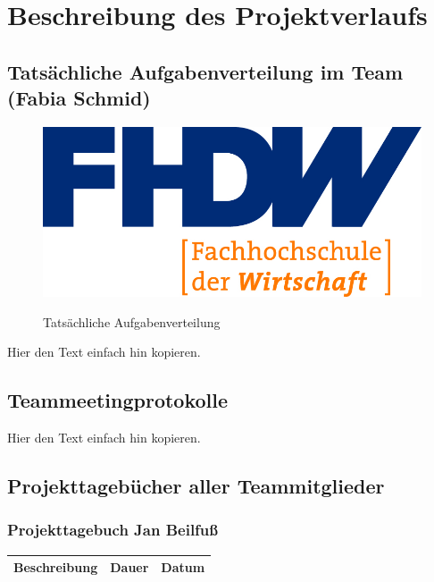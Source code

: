 \section{Beschreibung des Projektverlaufs}
\label{instal}

\subsection{Tatsächliche Aufgabenverteilung im Team (Fabia Schmid)}

\begin{figure}[H]
\centering
\begin{minipage}[t]{1\textwidth} %
\caption{Tatsächliche Aufgabenverteilung} %
\includegraphics[width=1\textwidth]{img/fhdw}\\ %
\end{minipage}
\end{figure}

Hier den Text einfach hin kopieren.

\subsection{Teammeetingprotokolle}

Hier den Text einfach hin kopieren.

\subsection{Projekttagebücher aller Teammitglieder}
\subsubsection{Projekttagebuch Jan Beilfuß}
\begin{longtable}{|p{10cm}|p{2cm}|p{2cm}|}
\hline
{\textbf{Beschreibung}} & {\textbf{Dauer}} & {\textbf{Datum}} \\ \hline

\end{longtable}

